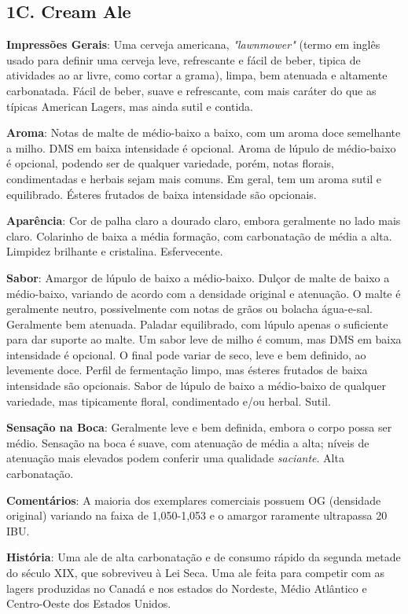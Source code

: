 \subsection*{1C. Cream Ale}
\textbf{Impressões Gerais}: Uma cerveja americana, \textit{"lawnmower"} (termo em inglês usado para definir uma cerveja leve, refrescante e fácil de beber, tipica de atividades ao ar livre, como cortar a grama), limpa, bem atenuada e altamente carbonatada. Fácil de beber, suave e refrescante, com mais caráter do que as típicas American Lagers, mas ainda sutil e contida.

\textbf{Aroma}: Notas de malte de médio-baixo a baixo, com um aroma doce semelhante a milho. DMS em baixa intensidade é opcional. Aroma de lúpulo de médio-baixo é opcional, podendo ser de qualquer variedade, porém, notas florais, condimentadas e herbais sejam mais comuns. Em geral, tem um aroma sutil e equilibrado. Ésteres frutados de baixa intensidade são opcionais.

\textbf{Aparência}: Cor de palha claro a dourado claro, embora geralmente no lado mais claro. Colarinho de baixa a média formação, com carbonatação de média a alta. Limpidez brilhante e cristalina. Esfervecente.

\textbf{Sabor}: Amargor de lúpulo de baixo a médio-baixo. Dulçor de malte de baixo a médio-baixo, variando de acordo com a densidade original e atenuação. O malte é geralmente neutro, possivelmente com notas de grãos ou bolacha água-e-sal. Geralmente bem atenuada. Paladar equilibrado, com lúpulo apenas o suficiente para dar suporte ao malte. Um sabor leve de milho é comum, mas DMS em baixa intensidade é opcional. O final pode variar de seco, leve e bem definido, ao levemente doce. Perfil de fermentação limpo, mas ésteres frutados de baixa intensidade são opcionais. Sabor de lúpulo de baixo a médio-baixo de qualquer variedade, mas tipicamente floral, condimentado e/ou herbal. Sutil.

\textbf{Sensação na Boca}: Geralmente leve e bem definida, embora o corpo possa ser médio. Sensação na boca é suave, com atenuação de média a alta; níveis de atenuação mais elevados podem conferir uma qualidade \textit{saciante}. Alta carbonatação.

\textbf{Comentários}: A maioria dos exemplares comerciais possuem OG (densidade original) variando na faixa de 1,050-1,053 e o amargor raramente ultrapassa 20 IBU.

\textbf{História}: Uma ale de alta carbonatação e de consumo rápido da segunda metade do século XIX, que sobreviveu à Lei Seca. Uma ale feita para competir com as lagers produzidas no Canadá e nos estados do Nordeste, Médio Atlântico e Centro-Oeste dos Estados Unidos.

